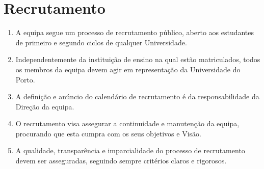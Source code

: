 \section{Recrutamento}
\begin{enumerate}
  \item A equipa segue um processo de recrutamento público, aberto aos estudantes de primeiro e segundo ciclos de qualquer Universidade.
  \item Independentemente da instituição de ensino na qual estão matriculados, todos os membros da equipa devem agir em representação da Universidade do Porto.
  \item A definição e anúncio do calendário de recrutamento é da responsabilidade da Direção da equipa.
  \item O recrutamento visa assegurar a continuidade e manutenção da equipa, procurando que esta cumpra com os seus objetivos e Visão.
  \item A qualidade, transparência e imparcialidade do processo de recrutamento devem ser asseguradas, seguindo sempre critérios claros e rigorosos.
\end{enumerate}

